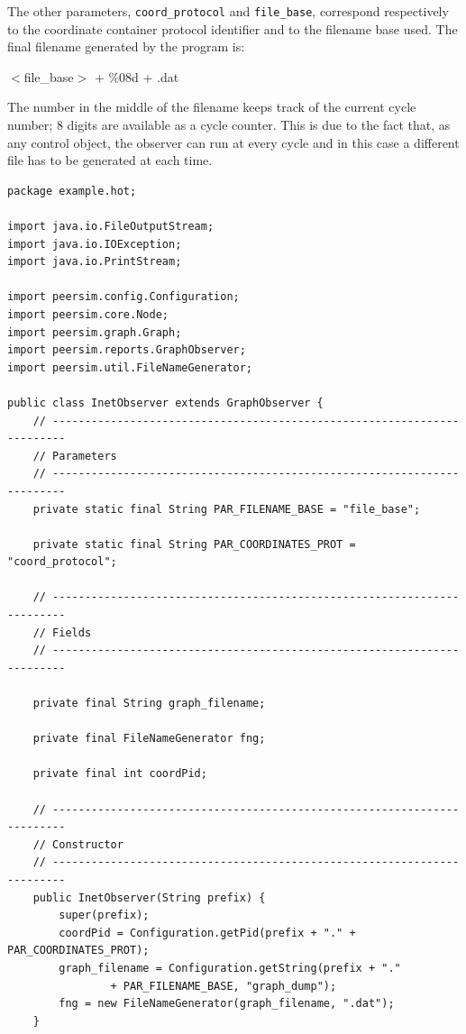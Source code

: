 \documentclass[a4paper,12pt]{article}
\begin{document}
The other parameters, \texttt{coord\_protocol} and \texttt{file\_base},
correspond respectively to the coordinate container protocol
identifier and to the filename base used. 
The final filename generated by
the program is: 

\begin{center}
$<$file\_base$>$ + \%08d + .dat 
\end{center}

The number in the middle of the filename keeps track of the current
cycle number; 8 digits are available as a cycle counter. 
This is due to the fact that, as any control object, the
observer can run at every cycle and in this case a
different file has to be generated at each time. 

\footnotesize
\begin{verbatim}
package example.hot;

import java.io.FileOutputStream;
import java.io.IOException;
import java.io.PrintStream;

import peersim.config.Configuration;
import peersim.core.Node;
import peersim.graph.Graph;
import peersim.reports.GraphObserver;
import peersim.util.FileNameGenerator;

public class InetObserver extends GraphObserver {
    // ------------------------------------------------------------------------
    // Parameters
    // ------------------------------------------------------------------------
    private static final String PAR_FILENAME_BASE = "file_base";

    private static final String PAR_COORDINATES_PROT = "coord_protocol";

    // ------------------------------------------------------------------------
    // Fields
    // ------------------------------------------------------------------------

    private final String graph_filename;

    private final FileNameGenerator fng;

    private final int coordPid;

    // ------------------------------------------------------------------------
    // Constructor
    // ------------------------------------------------------------------------
    public InetObserver(String prefix) {
        super(prefix);
        coordPid = Configuration.getPid(prefix + "." + PAR_COORDINATES_PROT);
        graph_filename = Configuration.getString(prefix + "."
                + PAR_FILENAME_BASE, "graph_dump");
        fng = new FileNameGenerator(graph_filename, ".dat");
    }


\end{verbatim}
\end{document}
